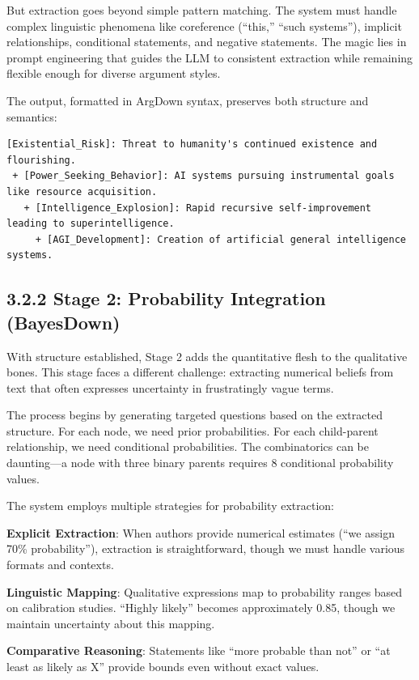 \documentclass[
  11pt,
  letterpaper,
]{book}
\begin{document}
But extraction goes beyond simple pattern matching. The system must
handle complex linguistic phenomena like coreference (``this,'' ``such
systems''), implicit relationships, conditional statements, and negative
statements. The magic lies in prompt engineering that guides the LLM to
consistent extraction while remaining flexible enough for diverse
argument styles.

The output, formatted in ArgDown syntax, preserves both structure and
semantics:

\begin{verbatim}
[Existential_Risk]: Threat to humanity's continued existence and flourishing.
 + [Power_Seeking_Behavior]: AI systems pursuing instrumental goals like resource acquisition.
   + [Intelligence_Explosion]: Rapid recursive self-improvement leading to superintelligence.
     + [AGI_Development]: Creation of artificial general intelligence systems.
\end{verbatim}

\subsection{3.2.2 Stage 2: Probability Integration
(BayesDown)}\label{sec-stage2-bayesdown}

With structure established, Stage 2 adds the quantitative flesh to the
qualitative bones. This stage faces a different challenge: extracting
numerical beliefs from text that often expresses uncertainty in
frustratingly vague terms.

The process begins by generating targeted questions based on the
extracted structure. For each node, we need prior probabilities. For
each child-parent relationship, we need conditional probabilities. The
combinatorics can be daunting---a node with three binary parents
requires 8 conditional probability values.

The system employs multiple strategies for probability extraction:

\textbf{Explicit Extraction}: When authors provide numerical estimates
(``we assign 70\% probability''), extraction is straightforward, though
we must handle various formats and contexts.

\textbf{Linguistic Mapping}: Qualitative expressions map to probability
ranges based on calibration studies. ``Highly likely'' becomes
approximately 0.85, though we maintain uncertainty about this mapping.

\textbf{Comparative Reasoning}: Statements like ``more probable than
not'' or ``at least as likely as X'' provide bounds even without exact
values.
\end{document}

